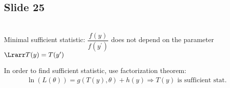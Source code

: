\subsection{Slide 25}\hfill\\
\noindent Minimal sufficient statistic: $\dfrac{f(y)}{f(y^{\prime})}$ does not depend on the parameter $\Lrarr T(y) = T(y^{\prime})$\par
\noindent In order to find sufficient statistic, use factorization theorem:
\begin{equation*}
  \begin{gathered}
    \ln{\left(L(\theta)\right)} = g(T(y),\theta)+h(y)\Rightarrow T(y)\text{ is sufficient stat.}
  \end{gathered}
\end{equation*}

